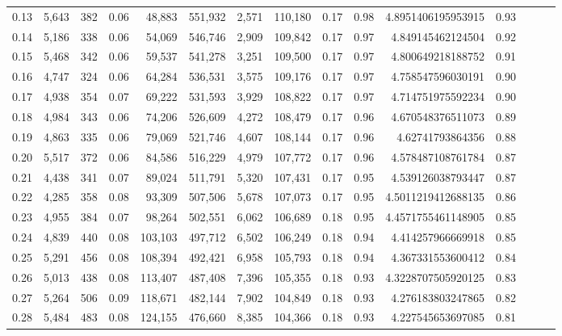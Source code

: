 \begin{tabular}{rrrrrrrrrrrrrrr}
0.13 &   5,643 &    382 &  0.06 &   48,883 &  551,932 &    2,571 &  110,180 &  0.17 &  0.98 &    4.8951406195953915 &      0.93 \\
0.14 &   5,186 &    338 &  0.06 &   54,069 &  546,746 &    2,909 &  109,842 &  0.17 &  0.97 &     4.849145462124504 &      0.92 \\
0.15 &   5,468 &    342 &  0.06 &   59,537 &  541,278 &    3,251 &  109,500 &  0.17 &  0.97 &     4.800649218188752 &      0.91 \\
0.16 &   4,747 &    324 &  0.06 &   64,284 &  536,531 &    3,575 &  109,176 &  0.17 &  0.97 &     4.758547596030191 &      0.90 \\
0.17 &   4,938 &    354 &  0.07 &   69,222 &  531,593 &    3,929 &  108,822 &  0.17 &  0.97 &     4.714751975592234 &      0.90 \\
0.18 &   4,984 &    343 &  0.06 &   74,206 &  526,609 &    4,272 &  108,479 &  0.17 &  0.96 &     4.670548376511073 &      0.89 \\
0.19 &   4,863 &    335 &  0.06 &   79,069 &  521,746 &    4,607 &  108,144 &  0.17 &  0.96 &      4.62741793864356 &      0.88 \\
0.20 &   5,517 &    372 &  0.06 &   84,586 &  516,229 &    4,979 &  107,772 &  0.17 &  0.96 &     4.578487108761784 &      0.87 \\
0.21 &   4,438 &    341 &  0.07 &   89,024 &  511,791 &    5,320 &  107,431 &  0.17 &  0.95 &     4.539126038793447 &      0.87 \\
0.22 &   4,285 &    358 &  0.08 &   93,309 &  507,506 &    5,678 &  107,073 &  0.17 &  0.95 &    4.5011219412688135 &      0.86 \\
0.23 &   4,955 &    384 &  0.07 &   98,264 &  502,551 &    6,062 &  106,689 &  0.18 &  0.95 &    4.4571755461148905 &      0.85 \\
0.24 &   4,839 &    440 &  0.08 &  103,103 &  497,712 &    6,502 &  106,249 &  0.18 &  0.94 &     4.414257966669918 &      0.85 \\
0.25 &   5,291 &    456 &  0.08 &  108,394 &  492,421 &    6,958 &  105,793 &  0.18 &  0.94 &     4.367331553600412 &      0.84 \\
0.26 &   5,013 &    438 &  0.08 &  113,407 &  487,408 &    7,396 &  105,355 &  0.18 &  0.93 &    4.3228707505920125 &      0.83 \\
0.27 &   5,264 &    506 &  0.09 &  118,671 &  482,144 &    7,902 &  104,849 &  0.18 &  0.93 &     4.276183803247865 &      0.82 \\
0.28 &   5,484 &    483 &  0.08 &  124,155 &  476,660 &    8,385 &  104,366 &  0.18 &  0.93 &     4.227545653697085 &      0.81 \\

\end{tabular}
